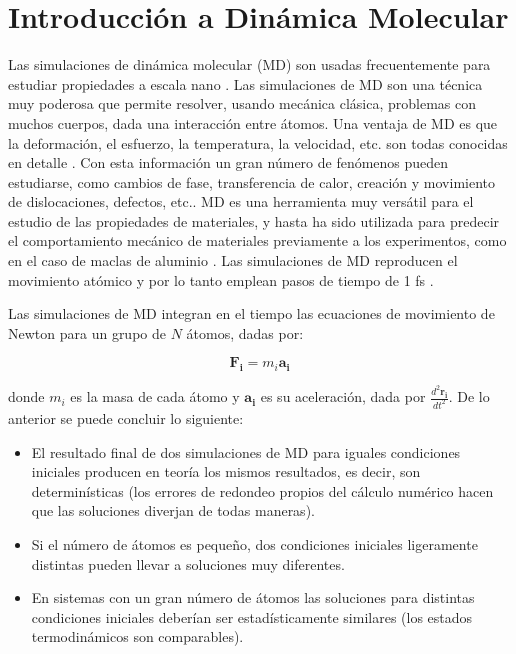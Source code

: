 
\section{Introducción a Dinámica Molecular}
\label{S2_2}

Las simulaciones de dinámica molecular (MD) son usadas frecuentemente para estudiar propiedades a escala nano \citep{allen87}. Las simulaciones de MD son una técnica muy poderosa que permite resolver, usando mecánica clásica, problemas con muchos cuerpos, dada una interacción entre átomos. Una ventaja de MD es que la deformación, el esfuerzo, la temperatura, la velocidad, etc. son todas conocidas en detalle \citep{allen87}. Con esta información un gran número de fenómenos pueden estudiarse, como cambios de fase, transferencia de calor, creación y movimiento de dislocaciones, defectos, etc.. MD es una herramienta muy versátil para el estudio de las propiedades de materiales, y hasta ha sido utilizada para predecir el comportamiento mecánico de materiales previamente a los experimentos, como en el caso de maclas de aluminio \citep{chen03}. Las simulaciones de MD reproducen el movimiento atómico y por lo tanto emplean pasos de tiempo de 1 fs \citep{allen87}.

Las simulaciones de MD integran en el tiempo las ecuaciones de movimiento de Newton para un grupo de $N$ átomos, dadas por:

\begin{equation}
\mathbf{F_{i}} = m_{i}\mathbf{a_{i}}
\end{equation}

donde $m_{i}$ es la masa de cada átomo y $\mathbf{a_{i}}$ es su aceleración, dada por $\frac{d^{2}\mathbf{r_{i}}}{dt^{2}}$. De lo anterior se puede concluir lo siguiente:

\begin{itemize}
 \item El resultado final de dos simulaciones de MD para iguales condiciones iniciales producen en teoría los mismos resultados, es decir, son determinísticas (los errores de redondeo propios del cálculo numérico hacen que las soluciones diverjan de todas maneras).
 \item Si el número de átomos es pequeño, dos condiciones iniciales ligeramente distintas pueden llevar a soluciones muy diferentes.
 \item En sistemas con un gran número de átomos las soluciones para distintas condiciones iniciales deberían ser estadísticamente similares (los estados termodinámicos son comparables).
\end{itemize}

